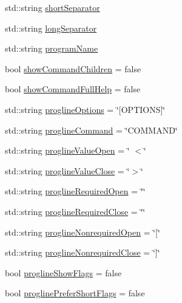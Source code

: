 \begin{DoxyCompactItemize}
\item 
std\+::string \hyperlink{structargs_1_1_help_params_aaac6918fadbcd5f1aa821c6a3f0df06e}{short\+Separator}
\item 
std\+::string \hyperlink{structargs_1_1_help_params_a2beb4a512d8df8075ade0633f4b4ef29}{long\+Separator}
\item 
std\+::string \hyperlink{structargs_1_1_help_params_a14ddec770768e14f9d7d2258087c4773}{program\+Name}
\item 
bool \hyperlink{structargs_1_1_help_params_a585abdd5c5f8a625a7cacff334caef43}{show\+Command\+Children} = false
\item 
bool \hyperlink{structargs_1_1_help_params_a19e10d39205d72ad6b313b24661f73d2}{show\+Command\+Full\+Help} = false
\item 
std\+::string \hyperlink{structargs_1_1_help_params_a2a160dc5478447bbb180b0a7918ef603}{progline\+Options} = \char`\"{}\mbox{[}O\+P\+T\+I\+O\+NS\mbox{]}\char`\"{}
\item 
std\+::string \hyperlink{structargs_1_1_help_params_a293b41204d7b0d4234b10fab09359a3d}{progline\+Command} = \char`\"{}C\+O\+M\+M\+A\+ND\char`\"{}
\item 
std\+::string \hyperlink{structargs_1_1_help_params_a38bf57bf50d6c8fc20d39c0abe6a3c0b}{progline\+Value\+Open} = \char`\"{} $<$\char`\"{}
\item 
std\+::string \hyperlink{structargs_1_1_help_params_aaf23390159bc7150ebf061700f1abf0b}{progline\+Value\+Close} = \char`\"{}$>$\char`\"{}
\item 
std\+::string \hyperlink{structargs_1_1_help_params_add18fdb27aa5f879c6dc94404ecabd0a}{progline\+Required\+Open} = \char`\"{}\char`\"{}
\item 
std\+::string \hyperlink{structargs_1_1_help_params_a65e80f546fe89ea346867e55d8b038f0}{progline\+Required\+Close} = \char`\"{}\char`\"{}
\item 
std\+::string \hyperlink{structargs_1_1_help_params_a4bc9f39986884a1781966d3bc437cde5}{progline\+Nonrequired\+Open} = \char`\"{}\mbox{[}\char`\"{}
\item 
std\+::string \hyperlink{structargs_1_1_help_params_a2525a4e9224b35041b314049e5d25678}{progline\+Nonrequired\+Close} = \char`\"{}\mbox{]}\char`\"{}
\item 
bool \hyperlink{structargs_1_1_help_params_a1f52f5914b60aa22c46476b8c5b62796}{progline\+Show\+Flags} = false
\item 
bool \hyperlink{structargs_1_1_help_params_a27b51014d4e96ea40ba46afcb6f0233c}{progline\+Prefer\+Short\+Flags} = false

\end{DoxyCompactItemize}

